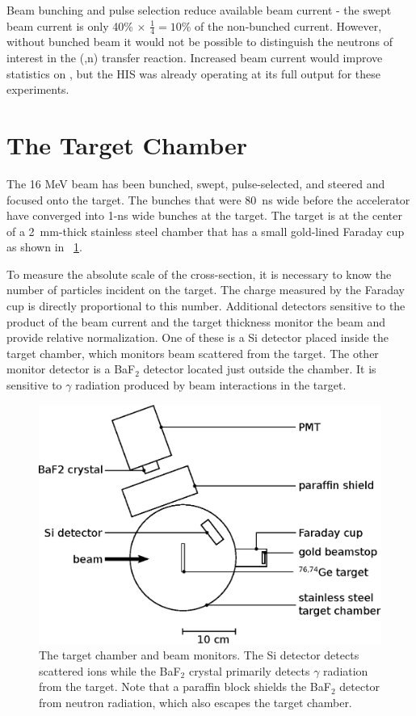 Beam bunching and pulse selection reduce available beam current - the swept beam current is only 40\% $\times$ $\frac{1}{4} = 10$\% of the non-bunched current.  However, without bunched beam it would not be possible to distinguish the neutrons of interest in the (,n) transfer reaction.  Increased beam current would improve statistics on \reaction, but the HIS was already operating at its full output for these experiments.

\section{The Target Chamber}

The 16 MeV  beam has been bunched, swept, pulse-selected, and steered and focused onto the target.  The bunches that were 80~ns wide before the accelerator have converged into 1-ns wide bunches at the target.  The target is at the center of a 2~mm-thick stainless steel chamber that has a small gold-lined Faraday cup as shown in {\fig}~\ref{fig:targetChamber}.

To measure the absolute scale of the cross-section, it is necessary to know the number of particles incident on the target.  The charge measured by the Faraday cup is directly proportional to this number.  Additional detectors sensitive to the product of the beam current and the target thickness monitor the beam and provide relative normalization.  One of these is a Si detector placed inside the target chamber, which monitors  beam scattered from the target.  The other monitor detector is a BaF$_2$ detector located just outside the chamber.  It is sensitive to $\gamma$ radiation produced by beam interactions in the target.  
\begin{figure}[htp]
\centering
\includegraphics[width=1.0\textwidth]{figures/targetChamber.eps}
\caption{The target chamber and beam monitors.  The Si detector detects scattered  ions while the BaF$_2$ crystal primarily detects $\gamma$ radiation from the target.  Note that a paraffin block shields the BaF$_2$ detector from neutron radiation, which also escapes the target chamber.}
\label{fig:targetChamber}
\end{figure}


